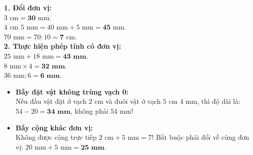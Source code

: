 \documentclass[11pt,a4paper]{article}
\begin{document}
\vspace{-2.5mm}
\noindent
\begin{minipage}[t]{0.49\textwidth}\vspace{0pt}
\begin{tcolorbox}[
  enhanced,
  colback=green!4!white,
  colframe=green!60!black,
  arc=2mm, boxrule=0.8pt,
  left=2mm, right=2mm, top=1.8mm, bottom=1.8mm,
  title={\footnotesize\bfseries\color{white}\faCheckCircle\ Ví dụ thực hành chuẩn mực}
]
{\footnotesize
\textbf{1. Đổi đơn vị:}\\
$3\text{ cm} = \mathbf{30}\text{ mm}$.\\
$4\text{ cm } 5\text{ mm} = 40\text{ mm} + 5\text{ mm} = \mathbf{45}\text{ mm}$.\\
$70\text{ mm} = 70 : 10 = \mathbf{7}\text{ cm}$.\\
\textbf{2. Thực hiện phép tính có đơn vị:}\\
$25\text{ mm} + 18\text{ mm} = \mathbf{43\text{ mm}}$.\\
$8\text{ mm} \times 4 = \mathbf{32\text{ mm}}$.\\
$36\text{ mm} : 6 = \mathbf{6\text{ mm}}$.
}
\end{tcolorbox}
\end{minipage}
\hfill
\begin{minipage}[t]{0.49\textwidth}\vspace{0pt}
\begin{tcolorbox}[
  enhanced,
  colback=red!4!white,
  colframe=red!70!black,
  arc=2mm, boxrule=0.8pt,
  left=2mm, right=2mm, top=1.8mm, bottom=1.8mm,
  title={\footnotesize\bfseries\color{white}\faExclamationTriangle\ Mẹo tránh bẫy trắc nghiệm}
]
{\footnotesize
\begin{itemize}\setlength{\itemsep}{1.5pt}\setlength{\leftskip}{-2.5mm}
  \item \textbf{Bẫy đặt vật không trùng vạch 0:}\\
  Nếu đầu vật đặt ở vạch $2\text{ cm}$ và đuôi vật ở vạch $5\text{ cm } 4\text{ mm}$, thì độ dài là: $54 - 20 = \mathbf{34\text{ mm}}$, không phải $54\text{ mm}$!
  \item \textbf{Bẫy cộng khác đơn vị:}\\
  Không được cộng trực tiếp $2\text{ cm} + 5\text{ mm} = 7$! Bắt buộc phải đổi về cùng đơn vị: $20\text{ mm} + 5\text{ mm} = \mathbf{25\text{ mm}}$.
\end{itemize}
}
\end{tcolorbox}
\end{minipage}
\end{document}
